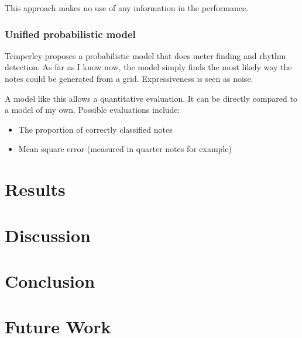 \documentclass[a4paper,10pt]{article}
\begin{document}
This approach makes no use of any information in the performance. 

\subsubsection*{Unified probabilistic model}
Temperley proposes a probabilistic model that does meter finding and rhythm detection. As far as I know now, the model simply finds the most likely way the notes could be generated from a grid. Expressiveness is seen as noise.

A model like this allows a quantitative evaluation. It can be directly compared to a model of my own. Possible evaluations include:
\begin{itemize}
\item The proportion of correctly classified notes
\item Mean square error (measured in quarter notes for example)
\end{itemize}

\section{Results}
\label{sec:results}

\section{Discussion}
\label{sec:discussion}

\section{Conclusion}
\label{sec:conclusion}

\section{Future Work}
\label{sec:futurework}




\end{document}
